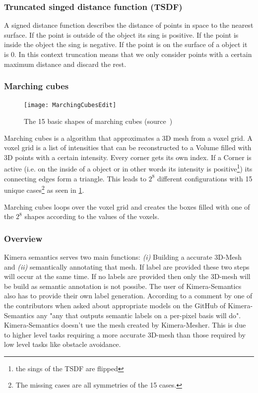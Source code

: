 \documentclass[11pt,a4paper]{article}
\begin{document}
\subsubsection{Truncated singed distance function (TSDF)} \label{pre:TSDF}
A signed distance function describes the distance of points in space to the nearest surface.
If the point is outside of the object its sing is positive.
If the point is inside the object the sing is negative. 
If the point is on the surface of a object it is 0. 
In this context truncation means that we only consider points with a certain maximum distance and discard the rest. 
\subsubsection{Marching cubes} \label{pre:marching cubes} 
\begin{figure}
  \centering
  \texttt{[image: MarchingCubesEdit]}
  \caption{The 15 basic shapes of marching cubes (source~\cite{marchingCubesImage})}\label{Fig:Marching cubes}  
\end{figure}
Marching cubes is a algorithm that approximates a 3D mesh from a voxel grid. 
A voxel grid is a list of intensities that can be reconstructed to a Volume filled with 3D points with a certain intensity. 
Every corner gets its own index.
If a Corner is active (i.e. on the inside of a object or in other words its intensity is positive\footnote{the sings of the TSDF are flipped}) its connecting edges form a triangle. 
This leads to $2^8$ different configurations with 15 unique cases\footnote{The missing cases are all symmetries of the 15 cases.} as seen in \ref{Fig:Marching cubes}.

Marching cubes loops over the voxel grid and creates the boxes filled with one of the $2^8$ shapes according to the values of the voxels.

\subsubsection{Overview}
Kimera semantics serves two main functions: \textit{(i)} Building a accurate 3D-Mesh and  \textit{(ii)} semantically annotating that mesh.
If label are provided these two steps will occur at the same time.  
If no labels are provided then only the 3D-mesh will be build as semantic annotation is not possibe.
The user of Kimera-Semantics also has to provide their own label generation. 
According to a comment by one of the contributors when asked about appropriate models on the GitHub of Kimera-Semantics any "any that outputs semantic labels on a per-pixel basis will do".
Kimera-Semantics doesn't use the mesh created by Kimera-Mesher. 
This is due to higher level tasks requiring a more accurate 3D-mesh than those required by low level tasks like obstacle avoidance.
\end{document}
